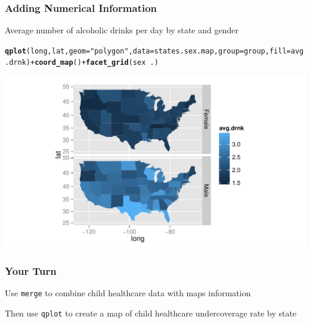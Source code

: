 \documentclass{beamer}\usepackage[]{graphicx}\usepackage[]{color}
\makeatletter
\newcommand{\hlstr}[1]{\textcolor[rgb]{0.192,0.494,0.8}{#1}}%
\newcommand{\hlopt}[1]{\textcolor[rgb]{0,0,0}{#1}}%
\newcommand{\hlstd}[1]{\textcolor[rgb]{0.345,0.345,0.345}{#1}}%
\newcommand{\hlkwc}[1]{\textcolor[rgb]{0.333,0.667,0.333}{#1}}%
\newcommand{\hlkwd}[1]{\textcolor[rgb]{0.737,0.353,0.396}{\textbf{#1}}}%
\newenvironment{kframe}{%
 \def\at@end@of@kframe{}%
 \ifinner\ifhmode%
  \def\at@end@of@kframe{\end{minipage}}%
  \begin{minipage}{\columnwidth}%
 \fi\fi%
 \def\FrameCommand##1{\hskip\@totalleftmargin \hskip-\fboxsep
 \colorbox{shadecolor}{##1}\hskip-\fboxsep
     \hskip-\linewidth \hskip-\@totalleftmargin \hskip\columnwidth}%
 \MakeFramed {\advance\hsize-\width
   \@totalleftmargin\z@ \linewidth\hsize
   \@setminipage}}%
 {\par\unskip\endMakeFramed%
 \at@end@of@kframe}
\newenvironment{knitrout}{}{} %
\makeatother
\begin{document}
\begin{frame}[fragile]
    \frametitle{Adding Numerical Information}

Average number of alcoholic drinks per day by state and gender

\begin{knitrout}\footnotesize
{}\color{fgcolor}\begin{kframe}
\begin{alltt}
\hlkwd{qplot}\hlstd{(long, lat,} \hlkwc{geom}\hlstd{=}\hlstr{"polygon"}\hlstd{,} \hlkwc{data}\hlstd{=states.sex.map,} \hlkwc{group}\hlstd{=group,} \hlkwc{fill}\hlstd{=avg.drnk)} \hlopt{+}  \hlkwd{coord_map}\hlstd{()} \hlopt{+} \hlkwd{facet_grid}\hlstd{(sex} \hlopt{~} \hlstd{.)}
\end{alltt}
\end{kframe}
\includegraphics[width=\textwidth]{figure/kalcohol1} 

\end{knitrout}
\end{frame}


\begin{frame}
    \frametitle{Your Turn}
    Use \texttt{merge} to combine child healthcare data with maps information \\
    
    \vspace{.4in}
    
    Then use \texttt{qplot} to create a map of child healthcare undercoverage rate by state
 
\end{frame}

\end{document}
